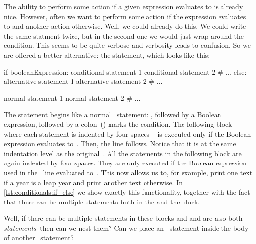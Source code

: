 %
The ability to perform some action if a given expression evaluates to  is already nice.
However, often we want to perform some action if the expression evaluates to  and another action otherwise.
Well, we could already do this.
We could write the same  statment twice, but in the second one we would just wrap  around the condition.
This seems to be quite verbose and verbosity leads to confusion.
So we are offered a better alternative: the  statement, which looks like this:%
%
\begin{pythonSyntax}
if booleanExpression:
    conditional statement 1
    conditional statement 2
    # ...
else:
    alternative statement 1
    alternative statement 2
    # ...

normal statement 1
normal statement 2
# ...
\end{pythonSyntax}
%
The statement begins like a normal ~statement:
, followed by a Boolean expression, followed by a colon~(\pythonilIdx{:}) marks the condition.
The following block -- where each statement is indented by four spaces -- is executed only if the Boolean expression evaluates to~.
Then, the  line follows.
Notice that it is at the same indentation level as the original~.
All the statements in the following block are again indented by four spaces.
They are only executed if the Boolean expression used in the ~line evaluated to~.
This now allows us to, for example, print one text if a year is a leap year and print another text otherwise.
In \cref{lst:conditionals:if_else} we show exactly this functionality, together with the fact that there can be multiple statements both in the  and the  block.

Well, if there can be multiple statements in these blocks and  and  are also both \emph{statements}, then can we nest them?
Can we place an ~statement inside the body of another ~statement?

